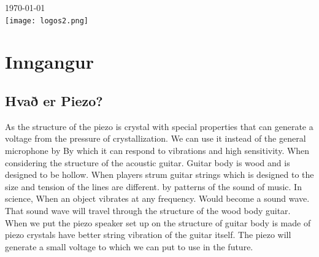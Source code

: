 \documentclass{article}
\begin{document}
\begin{titlepage}


{\large \today}\\[1cm] %


\texttt{[image: logos2.png]}\\[1cm] %
 

\vfill %

\end{titlepage}
	\newpage
{}
	\tableofcontents
\restoregeometry
	\newpage



 
\section{Inngangur}
\label{chapter}
\subsection{Hvað er Piezo?}
\begin{flushleft}
As the structure of the piezo is crystal with special properties that can generate a voltage from the pressure of crystallization. We can use it instead of the general microphone by By which it can respond to vibrations and high sensitivity. When considering the structure of the acoustic guitar. Guitar body is wood and is designed to be hollow. When players strum guitar strings which is designed to the size and tension of the lines are different. by patterns of the sound of music. In science, When an object vibrates at any frequency. Would become a sound wave. That sound wave will travel through the structure of the wood body guitar. When we put the piezo speaker set up on the structure of guitar body is made of piezo crystals have better string vibration of the guitar itself. The piezo will generate a small voltage to which we can put to use in the future.
\end{flushleft}
\end{document}
